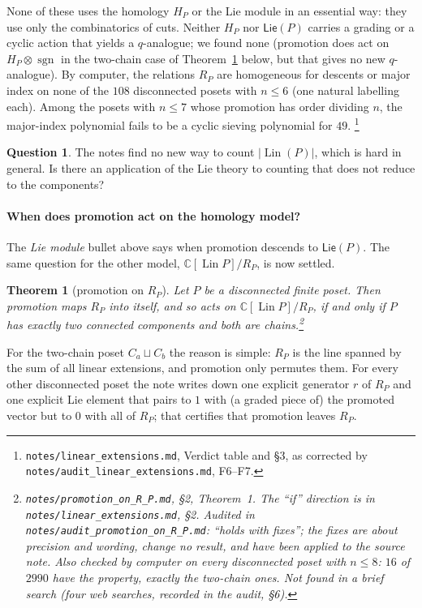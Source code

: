 \documentclass[11pt]{article}
\newtheorem{theorem}{Theorem}
\theoremstyle{definition}
\newtheorem{question}{Question}
\theoremstyle{remark}
\newcommand{\Lin}{\operatorname{Lin}}
\newcommand{\PLie}{\mathsf{Lie}}
\newcommand{\sgn}{\operatorname{sgn}}
\newcommand{\src}[1]{\nolinkurl{#1}}
\newcommand{\tagbox}[1]{\leavevmode\marginpar{\raggedright\fbox{\parbox{0.66in}{\centering\scriptsize\sffamily #1}}}}
\newcommand{\PROVEN}{\tagbox{PROVEN\\AUDITED}}
\newcommand{\COMPUTED}{\tagbox{COMPUTED}}
\begin{document}
None of these uses the homology $H_P$ or the Lie module in an essential
way: they use only the combinatorics of cuts. Neither $H_P$ nor $\PLie(P)$
carries a grading or a cyclic action that yields a $q$-analogue; we found
none (promotion does act on $H_P\otimes\sgn$ in the two-chain case of
Theorem~\ref{thm:promRP} below, but that gives no new $q$-analogue). By computer, the relations $R_P$ are homogeneous for descents or
major index on none of the $108$ disconnected posets with $n\le6$ (one
natural labelling each). Among the posets with $n\le7$ whose promotion
has order dividing $n$, the major-index polynomial fails to be a cyclic
sieving polynomial for $49$.%
\footnote{\src{notes/linear_extensions.md}, Verdict table and \S3, as
corrected by \src{notes/audit_linear_extensions.md}, F6--F7.}\COMPUTED

\begin{question}
The notes find no new way to count $|\Lin(P)|$, which is hard in general. Is
there an application of the Lie theory to counting that does not reduce to
the components?
\end{question}

\paragraph{When does promotion act on the homology model?} The
\emph{Lie module} bullet above says when promotion descends to $\PLie(P)$.
The same question for the other model, $\mathbb C[\Lin P]/R_P$, is now
settled.

\begin{theorem}[promotion on $R_P$]\label{thm:promRP}\PROVEN
Let $P$ be a disconnected finite poset. Then promotion maps $R_P$ into
itself, and so acts on $\mathbb C[\Lin P]/R_P$, if and only if $P$ has
exactly two connected components and both are chains.\footnote{%
\src{notes/promotion_on_R_P.md}, \S2, Theorem~1. The ``if'' direction is
in \src{notes/linear_extensions.md}, \S2. Audited in
\src{notes/audit_promotion_on_R_P.md}: ``holds with fixes''; the fixes are
about precision and wording, change no result, and have been applied to the
source note. Also checked by computer on every disconnected poset with
$n\le8$: $16$ of $2990$ have the property, exactly the two-chain ones. Not
found in a brief search (four web searches, recorded in the audit, \S6).}
\end{theorem}

For the two-chain poset $C_a\sqcup C_b$ the reason is simple: $R_P$ is the
line spanned by the sum of all linear extensions, and promotion only
permutes them. For every other disconnected poset the note writes down one
explicit generator $r$ of $R_P$ and one explicit Lie element that pairs to
$1$ with (a graded piece of) the promoted vector but to $0$ with all of
$R_P$; that certifies that promotion leaves $R_P$.
\end{document}
